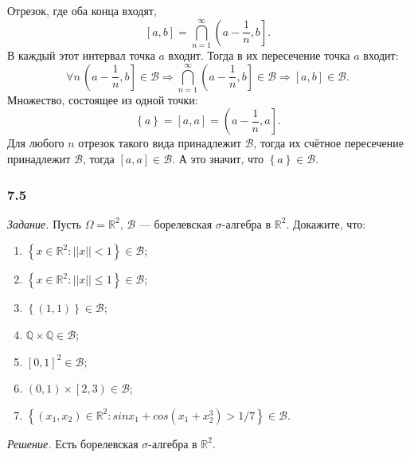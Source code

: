 Отрезок, где оба конца входят,
$$ \left[ a, b \right] =
\bigcap \limits_{n=1}^{ \infty } \left( a - \frac{1}{n}, b \right].$$
В каждый этот интервал точка $a$ входит.
Тогда в их пересечение точка $a$ входит:
$$ \forall n \,
\left( a - \frac{1}{n}, b \right] \in \mathcal{B} \Rightarrow
\bigcap \limits_{n=1}^{ \infty } \left( a - \frac{1}{n}, b \right] \in \mathcal{B} \Rightarrow
\left[ a, b \right] \in \mathcal{B}.$$
Множество, состоящее из одной точки:
$$ \left\{ a \right\} =
\left[ a, a \right] =
\left( a - \frac{1}{n}, a \right].$$
Для любого $n$ отрезок такого вида принадлежит $ \mathcal{B} $, тогда их счётное пересечение принадлежит $ \mathcal{B} $, тогда $ \left[ a, a \right] \in \mathcal{B} $.
А это значит, что $ \left\{ a \right\} \in \mathcal{B} $.

\subsubsection*{7.5}

\textit{Задание.} Пусть $ \Omega = \mathbb{R}^2, \, \mathcal{B} $ --- борелевская $ \sigma $-алгебра в $ \mathbb{R}^2$.
Докажите, что:
\begin{enumerate}[label=\alph*)]
\item $ \left\{ x \in \mathbb{R}^2: \left| \left| x \right| \right| < 1 \right\} \in \mathcal{B} $;
\item $ \left\{ x \in \mathbb{R}^2: \left| \left| x \right| \right| \leq 1 \right\} \in \mathcal{B} $;
\item $ \left\{ \left( 1, 1 \right) \right\} \in \mathcal{B} $;
\item $ \mathbb{Q} \times \mathbb{Q} \in \mathcal{B} $;
\item $ \left[ 0, 1 \right]^2 \in \mathcal{B} $;
\item $ \left( 0, 1 \right) \times \left[ 2, 3 \right) \in \mathcal{B} $;
\item $ \left\{ \left( x_1, x_2 \right) \in \mathbb{R}^2: sin x_1 + cos \left( x_1 + x_2^3 \right) > 1/7 \right\} \in \mathcal{B} $.
\end{enumerate}

\textit{Решение.} Есть борелевская $ \sigma $-алгебра в $ \mathbb{R}^2$.

